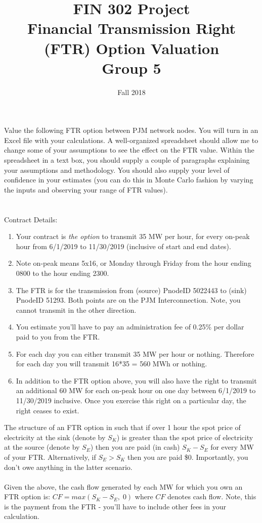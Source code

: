 \documentclass{article}
\title{FIN 302 Project \\
Financial Transmission Right (FTR) Option Valuation \\
\vspace{15pt}
\large{{\bf Group 5}}\\
\large{}}
\date{Fall 2018}
\begin{document}
\maketitle
\noindent Value the following FTR option between PJM network nodes.  You will turn in an Excel file with your calculations. A well-organized spreadsheet should allow me to change some of your assumptions to see the effect on the FTR value.  Within the spreadsheet in a text box, you should supply a couple of paragraphs explaining your assumptions and methodology.  You should also supply your level of confidence in your estimates (you can do this in Monte Carlo fashion by varying the inputs and observing your range of FTR values).\\\\
\\
Contract Details:\\
\begin{enumerate}
\item Your contract is {\it the option} to transmit 35 MW per hour, for every on-peak hour from 6/1/2019 to 11/30/2019 (inclusive of start and end dates).
\item Note on-peak means 5x16, or Monday through Friday from the hour ending 0800 to the hour ending 2300.  
\item The FTR is for the transmission from (source) PnodeID 5022443 to (sink) PnodeID 51293.  Both points are on the PJM Interconnection. Note, you cannot transmit in the other direction.  
\item You estimate you'll have to pay an administration fee of 0.25\% per dollar paid to you from the FTR. 
\item For each day you can either transmit 35 MW per hour or nothing.  Therefore for each day you will transmit 16*35 = 560 MWh or nothing.
\item  In addition to the FTR option above, you will also have the right to transmit an additional 60 MW for each on-peak hour on one day between 6/1/2019 to 11/30/2019 inclusive.  Once you exercise this right on a particular day, the right ceases to exist.    
\end{enumerate} 
The structure of an FTR option in such that if over 1 hour the spot price of electricity at the sink (denote by $S_K$) is greater than the spot price of electricity at the source (denote by $S_E$) then you are paid (in cash) $S_K-S_E$ for every MW of your FTR.  Alternatively, if $S_E > S_K $ then you are paid \$0.  Importantly, you don't owe anything  in the latter scenario.  \\
\\
Given the above, the cash flow generated by each MW for which you own an FTR option is: $CF=max(S_K-S_E, \; 0)$ where $CF$ denotes cash flow.  Note, this is the payment from the FTR - you'll have to include other fees in your calculation.
\end{document}
